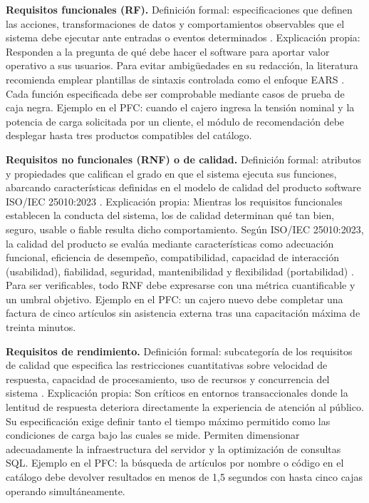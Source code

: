 \documentclass[onecolumn,12pt]{IEEEtran}
\begin{document}
	\textbf{Requisitos funcionales (RF).} Definici\'on formal: especificaciones que definen las acciones, transformaciones de datos y comportamientos observables que el sistema debe ejecutar ante entradas o eventos determinados \cite{iso29148,pohl2025,swebok4}. Explicaci\'on propia: Responden a la pregunta de qu\'e debe hacer el software para aportar valor operativo a sus usuarios. Para evitar ambig\"uedades en su redacci\'on, la literatura recomienda emplear plantillas de sintaxis controlada como el enfoque EARS \cite{mavin2009}. Cada funci\'on especificada debe ser comprobable mediante casos de prueba de caja negra. Ejemplo en el PFC: cuando el cajero ingresa la tensi\'on nominal y la potencia de carga solicitada por un cliente, el m\'odulo de recomendaci\'on debe desplegar hasta tres productos compatibles del cat\'alogo.
	
	\textbf{Requisitos no funcionales (RNF) o de calidad.} Definici\'on formal: atributos y propiedades que califican el grado en que el sistema ejecuta sus funciones, abarcando caracter\'isticas definidas en el modelo de calidad del producto software ISO/IEC 25010:2023 \cite{iso25010,pohl2025,glinz2007}. Explicaci\'on propia: Mientras los requisitos funcionales establecen la conducta del sistema, los de calidad determinan qu\'e tan bien, seguro, usable o fiable resulta dicho comportamiento. Seg\'un ISO/IEC 25010:2023, la calidad del producto se eval\'ua mediante caracter\'isticas como adecuaci\'on funcional, eficiencia de desempe\~no, compatibilidad, capacidad de interacci\'on (usabilidad), fiabilidad, seguridad, mantenibilidad y flexibilidad (portabilidad) \cite{iso25010}. 
	Para ser verificables, todo RNF debe expresarse con una m\'etrica cuantificable y un umbral objetivo. Ejemplo en el PFC: un cajero nuevo debe completar una factura de cinco art\'iculos sin asistencia externa tras una capacitaci\'on m\'axima de treinta minutos.
	
	\textbf{Requisitos de rendimiento.} Definici\'on formal: subcategor\'ia de los requisitos de calidad que especifica las restricciones cuantitativas sobre velocidad de respuesta, capacidad de procesamiento, uso de recursos y concurrencia del sistema \cite{iso29148,iso25010,wiegers2013}. Explicaci\'on propia: Son cr\'iticos en entornos transaccionales donde la lentitud de respuesta deteriora directamente la experiencia de atenci\'on al p\'ublico. Su especificaci\'on exige definir tanto el tiempo m\'aximo permitido como las condiciones de carga bajo las cuales se mide. Permiten dimensionar adecuadamente la infraestructura del servidor y la optimizaci\'on de consultas SQL. Ejemplo en el PFC: la b\'usqueda de art\'iculos por nombre o c\'odigo en el cat\'alogo debe devolver resultados en menos de 1,5 segundos con hasta cinco cajas operando simult\'aneamente.
	
\end{document}
